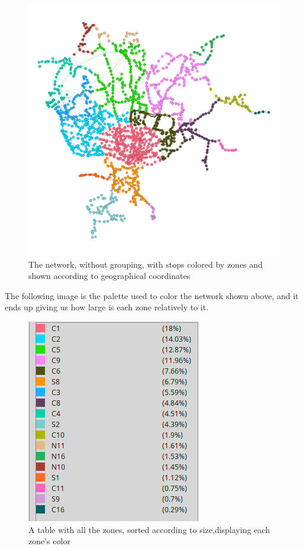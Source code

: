 \documentclass[12pt]{article}
\begin{document}
\begin{multicols}{2}
\begin{figure}[H]
	\centering
	\includegraphics[scale=0.2]{simple_network}
	\caption{The network, without grouping, with stops colored by zones and shown according to geographical coordinates}
\end{figure}
The following image is the palette used to color the network shown above, and it ends up giving us how large is each zone relatively to it.\\
\begin{figure}[H]
	\centering
	\includegraphics[scale=0.5]{legenda_simples}
	\caption{A table with all the zones, sorted according to size,displaying each zone's color}
\end{figure}


\end{multicols}
\end{document}
